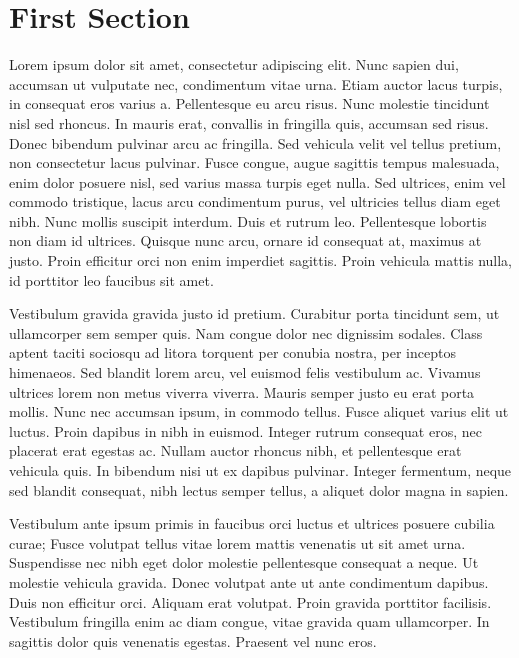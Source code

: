 \documentclass{report}
\begin{document}
	\doublespacing  %
	
	\section{First Section}
	
	Lorem ipsum dolor sit amet, consectetur adipiscing elit. Nunc sapien dui, accumsan ut vulputate nec, condimentum vitae urna. Etiam auctor lacus turpis, in consequat eros varius a. Pellentesque eu arcu risus. Nunc molestie tincidunt nisl sed rhoncus. In mauris erat, convallis in fringilla quis, accumsan sed risus. Donec bibendum pulvinar arcu ac fringilla. Sed vehicula velit vel tellus pretium, non consectetur lacus pulvinar. Fusce congue, augue sagittis tempus malesuada, enim dolor posuere nisl, sed varius massa turpis eget nulla. Sed ultrices, enim vel commodo tristique, lacus arcu condimentum purus, vel ultricies tellus diam eget nibh. Nunc mollis suscipit interdum. Duis et rutrum leo. Pellentesque lobortis non diam id ultrices. Quisque nunc arcu, ornare id consequat at, maximus at justo. Proin efficitur orci non enim imperdiet sagittis. Proin vehicula mattis nulla, id porttitor leo faucibus sit amet.
	
	Vestibulum gravida gravida justo id pretium. Curabitur porta tincidunt sem, ut ullamcorper sem semper quis. Nam congue dolor nec dignissim sodales. Class aptent taciti sociosqu ad litora torquent per conubia nostra, per inceptos himenaeos. Sed blandit lorem arcu, vel euismod felis vestibulum ac. Vivamus ultrices lorem non metus viverra viverra. Mauris semper justo eu erat porta mollis. Nunc nec accumsan ipsum, in commodo tellus. Fusce aliquet varius elit ut luctus. Proin dapibus in nibh in euismod. Integer rutrum consequat eros, nec placerat erat egestas ac. Nullam auctor rhoncus nibh, et pellentesque erat vehicula quis. In bibendum nisi ut ex dapibus pulvinar. Integer fermentum, neque sed blandit consequat, nibh lectus semper tellus, a aliquet dolor magna in sapien.
	
	\vspace{2cm}
	Vestibulum ante ipsum primis in faucibus orci luctus et ultrices posuere cubilia curae; Fusce volutpat tellus vitae lorem mattis venenatis ut sit amet urna. Suspendisse nec nibh eget dolor molestie pellentesque consequat a neque. Ut molestie vehicula gravida. Donec volutpat ante ut ante condimentum dapibus. Duis non efficitur orci. Aliquam erat volutpat. Proin gravida porttitor facilisis. Vestibulum fringilla enim ac diam congue, vitae gravida quam ullamcorper. In sagittis dolor quis venenatis egestas. Praesent vel nunc eros.
\end{document}
